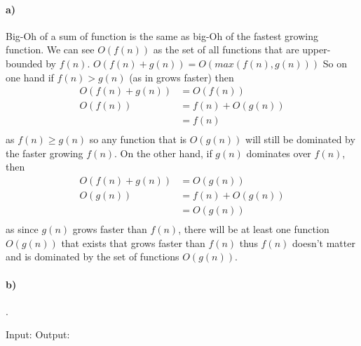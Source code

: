 \documentclass[11pt,letterpaper]{article}
\begin{document}
		\paragraph{a)}
		Big-Oh of a sum of function is the same as big-Oh of the fastest growing function. We can see $O(f(n))$ as the set of all functions that are upper-bounded by $f(n)$.
		$O(f(n)+g(n)) = O(max(f(n),g(n)))$
		So on one hand if $f(n) > g(n)$ (as in grows faster) then
		\begin{align*}
		O(f(n)+g(n)) &= O(f(n)) \\
		O(f(n)) &= f(n) + O(g(n)) \\
		& = f(n) \\
		\end{align*}
		as $f(n) \ge g(n)$ so any function that is $O(g(n))$ will still be dominated by the faster growing $f(n)$.
		On the other hand, if $g(n)$ dominates over $f(n)$, then
		\begin{align*}
		O(f(n)+g(n)) &= O(g(n)) \\
		O(g(n)) &= f(n) + O(g(n)) \\
		& = O(g(n)) \\
		\end{align*}
		as since $g(n)$ grows faster than $f(n)$, there will be at least one function $O(g(n))$ that exists that grows faster than $f(n)$ thus $f(n)$ doesn't matter and is dominated by the set of functions $O(g(n))$.
		
		\paragraph{b)}
		.
		
		\begin{algorithm}[caption={f()}, label={alg5}]
Input: 
Output: 


		\end{algorithm}
		
\end{document}
